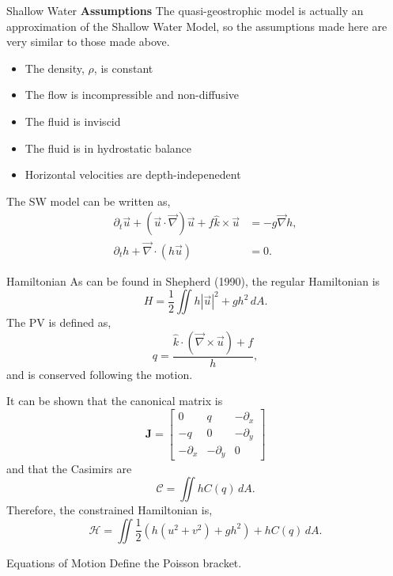 \documentclass[12pt]{article}
\begin{document}
\newpage
\begin{section}{Shallow Water}
    \textbf{Assumptions}
    The quasi-geostrophic model is actually an approximation of the Shallow Water Model, so the assumptions made here are very similar to those made above.
    \begin{itemize}
        \item The density, $\rho$, is constant
        \item The flow is incompressible and non-diffusive
        \item The fluid is inviscid
        \item The fluid is in hydrostatic balance
        \item Horizontal velocities are depth-indepenedent
    \end{itemize}

    The SW model can be written as,
    \begin{align*}
        \partial_t \vec u + (\vec u \cdot \vec \nabla) \vec u + f \hat k \times \vec u &= - g \vec \nabla h, \\
        \partial_t h + \vec\nabla \cdot \left( h \vec u \right) & = 0.
    \end{align*}

    \begin{subsection}{Hamiltonian}
        As can be found in Shepherd (1990), the regular Hamiltonian is
        $$
        H = \frac12 \iint h | \vec u |^2 + g h^2 \, dA.
        $$
        The PV is defined as,
        $$
        q = \frac{ \hat k \cdot (\vec \nabla \times \vec u) + f}{h},
        $$
        and is conserved following the motion.

        It can be shown that the canonical matrix is
        $$
        \mathbf{J} = \left[\begin{array}{ccc}
        0 & q & -\partial_x \\
        -q & 0 & -\partial_y \\
        -\partial_x & -\partial_y & 0
        \end{array}\right]
        $$
        and that the Casimirs are
        $$
        \mathcal{C} = \iint hC(q) \, dA.
        $$
        Therefore, the constrained Hamiltonian is,
        $$
        \mathcal{H} =  \iint \frac12  \left( h (u^2 + v^2) + g h^2 \right) + h C(q) \, dA.
        $$
    \end{subsection}

    \begin{subsection}{Equations of Motion}
        Define the Poisson bracket.


\end{subsection}
\end{section}
\end{document}
